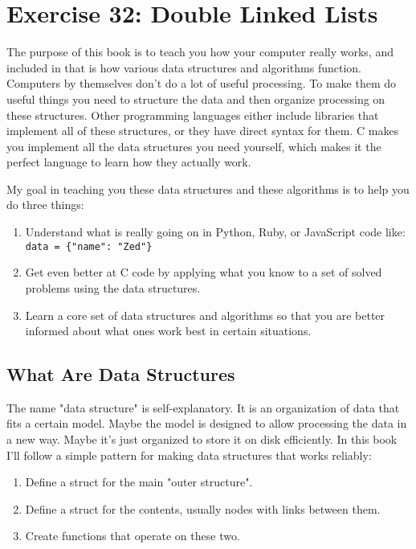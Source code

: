 \chapter{Exercise 32: Double Linked Lists}

The purpose of this book is to teach you how your computer really works, and included in that is
how various data structures and algorithms function.  Computers by themselves don't do a lot of
useful processing.  To make them do useful things you need to structure the data and then
organize processing on these structures.  Other programming languages either include libraries
that implement all of these structures, or they have direct syntax for them.  C makes you
implement all the data structures you need yourself, which makes it the perfect language to
learn how they actually work.

My goal in teaching you these data structures and these algorithms is to help you do three
things:

\begin{enumerate}
\item Understand what is really going on in Python, Ruby, or JavaScript code like: \verb|data = {"name": "Zed"}|
\item Get even better at C code by applying what you know to a set of solved problems using the data structures.
\item Learn a core set of data structures and algorithms so that you are better informed about what ones work best in certain situations.
\end{enumerate}


\section{What Are Data Structures}

The name "data structure" is self-explanatory.  It is an organization of data that fits a certain model.  Maybe the model is
designed to allow processing the data in a new way.  Maybe it's just organized to store it on disk efficiently.  In this book
I'll follow a simple pattern for making data structures that works reliably:

\begin{enumerate}
\item Define a struct for the main "outer structure".
\item Define a struct for the contents, usually nodes with links between them.
\item Create functions that operate on these two.
\end{enumerate}

